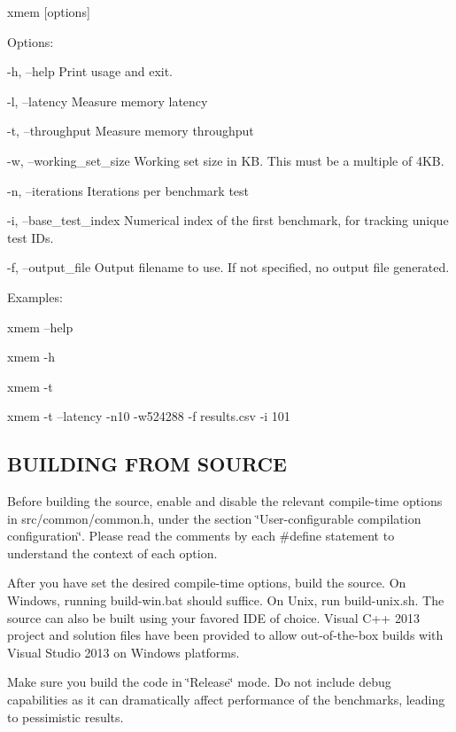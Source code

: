 xmem \mbox{[}options\mbox{]}

Options\+: \begin{DoxyVerb}-h, --help                Print usage and exit.

-l, --latency             Measure memory latency

-t, --throughput          Measure memory throughput

-w, --working_set_size    Working set size in KB. This must be a multiple of
                          4KB.

-n, --iterations          Iterations per benchmark test

-i, --base_test_index     Numerical index of the first benchmark, for
                          tracking unique test IDs.

-f, --output_file         Output filename to use. If not specified, no
                          output file generated.
\end{DoxyVerb}


Examples\+: \begin{DoxyVerb}xmem --help

xmem -h

xmem -t

xmem -t --latency -n10 -w524288 -f results.csv -i 101
\end{DoxyVerb}




 \subsection*{B\+U\+I\+L\+D\+I\+N\+G F\+R\+O\+M S\+O\+U\+R\+C\+E }

Before building the source, enable and disable the relevant compile-\/time options in src/common/common.\+h, under the section \char`\"{}\+User-\/configurable compilation configuration\char`\"{}. Please read the comments by each \#define statement to understand the context of each option.

After you have set the desired compile-\/time options, build the source. On Windows, running build-\/win.\+bat should suffice. On Unix, run build-\/unix.\+sh. The source can also be built using your favored I\+D\+E of choice. Visual C++ 2013 project and solution files have been provided to allow out-\/of-\/the-\/box builds with Visual Studio 2013 on Windows platforms.

Make sure you build the code in \char`\"{}\+Release\char`\"{} mode. Do not include debug capabilities as it can dramatically affect performance of the benchmarks, leading to pessimistic results. 

